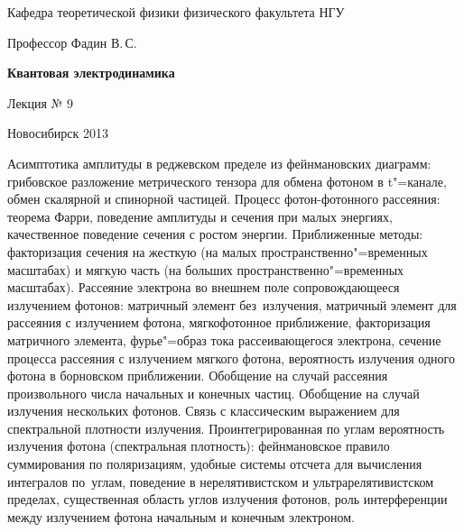 \documentclass[12pt,pagesize,paper=landscape,paper=192mm:108mm]{scrbook}
\begin{document}
\begin{titlepage}
\begin{center}
    Кафедра теоретической физики физического факультета НГУ
    \medskip

    \Large
    Профессор Фадин В.\,С.
    \bigskip

    \huge
    \textbf{Квантовая электродинамика}
    \bigskip

    \Large
    Лекция № 9
    \vfill

    \normalsize
    \vfill

    \normalsize \ccbysa\hspace{0.5em}  Новосибирск 2013
  \end{center}
\end{titlepage}
\vspace*{-1em}
\begin{center}
\vfill
  \begin{minipage}{0.9\linewidth}
    Асимптотика амплитуды в реджевском пределе из фейнмановских
    диаграмм: грибовское разложение метрического тензора для обмена
    фотоном в t"=канале, обмен скалярной и спинорной частицей. Процесс
    фотон-фотонного рассеяния: теорема Фарри, поведение амплитуды и
    сечения при малых энергиях, качественное поведение сечения с
    ростом энергии. Приближенные методы: факторизация сечения на
    жесткую (на малых пространственно"=временных масштабах) и мягкую
    часть (на больших пространственно"=временных масштабах). Рассеяние
    электрона во внешнем поле сопровождающееся излучением фотонов:
    матричный элемент без~излучения, матричный элемент для рассеяния с
    излучением фотона, мягкофотонное приближение, факторизация
    матричного элемента, фурье"=образ тока рассеивающегося электрона,
    сечение процесса рассеяния с излучением мягкого фотона,
    вероятность излучения одного фотона в борновском
    приближении. Обобщение на случай рассеяния произвольного числа
    начальных и конечных частиц. Обобщение на случай излучения
    нескольких фотонов. Связь с классическим выражением для
    спектральной плотности излучения. Проинтегрированная по углам
    вероятность излучения фотона (спектральная плотность):
    фейнмановское правило суммирования по поляризациям, удобные
    системы отсчета для вычисления интегралов по~углам, поведение в
    нерелятивистском и ультрарелятивистском пределах, существенная
    область углов излучения фотонов, роль интерференции между
    излучением фотона начальным и конечным электроном.
  \end{minipage}
  \vfill

\end{center}
\end{document}
